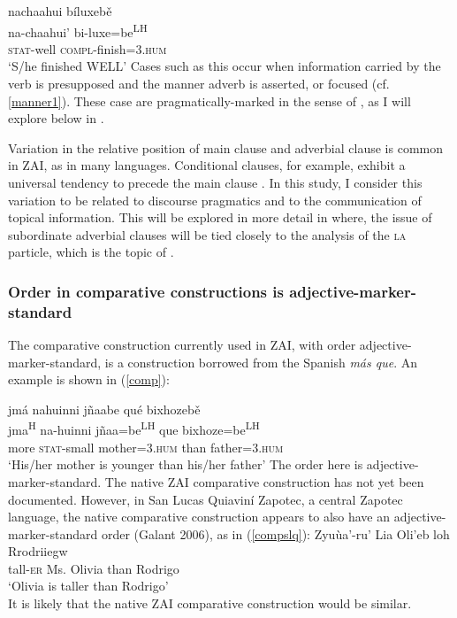 \ea\label{manner3}
\glll nachaahui b\'{i}luxeb\v{e} \\
na-chaahui' bi-luxe=be\textsuperscript{LH} \\
\textsc{stat}-well \textsc{compl}-finish=\textsc{3.hum} \\
\glt `S/he finished WELL'
\z
Cases such as this occur when information carried by the verb is presupposed and the manner adverb is asserted, or focused (cf. \ref{manner1}). These case are pragmatically-marked in the sense of \citet{payne1995}, as I will explore below in .

Variation in the relative position of main clause and adverbial clause is common in ZAI, as in many languages. Conditional clauses, for example, exhibit a universal tendency to precede the main clause \citep{haiman1978}. In this study, I consider this variation to be related to discourse pragmatics and to the communication of topical information. This will be explored in more detail in  where, the issue of subordinate adverbial clauses will be tied closely to the analysis of the \textsc{la} particle, which is the topic of .


\subsubsection{Order in comparative constructions is adjective-marker-standard}

The comparative construction currently used in ZAI, with order adjective-marker-standard, is a construction borrowed from the Spanish \textit{m\'{a}s que}. An example is shown in (\ref{comp}):

\ea\label{comp}
\glll jm\'{a} nahuinni j\~{n}aabe qu\'{e} bixhozeb\v{e} \\
jma\textsuperscript{H} na-huinni j\~{n}aa=be\textsuperscript{LH} que bixhoze=be\textsuperscript{LH} \\
more \textsc{stat}-small mother=\textsc{3.hum} than father=\textsc{3.hum} \\
\glt `His/her mother is younger than his/her father'
\z
The order here is adjective-marker-standard. The native ZAI comparative construction has not yet been documented. However, in San Lucas Quiavin\'{i} Zapotec, a central Zapotec language, the native comparative construction appears to also have an adjective-marker-standard order (Galant 2006), as in (\ref{compslq}):
\ea\label{compslq}
\gll Zyu\`{u}a'-ru' Lia Oli'eb loh Rrodriiegw \\
tall-\textsc{er} Ms. Olivia than Rodrigo \\
\glt `Olivia is taller than Rodrigo' \\
\z
It is likely that the native ZAI comparative construction would be similar.


